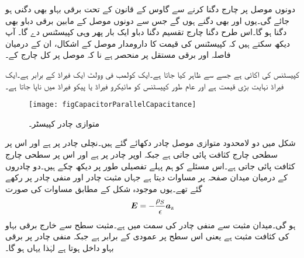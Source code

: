 دونوں موصل پر چارج دگنا کرنے سے گاوس کے قانون کے تحت برقی بہاو بھی دگنی ہو جائے گی۔یوں  اور  بھی دگنے ہوں گے جس سے دونوں موصل کے مابین برقی دباو بھی دگنا ہو گا۔اس طرح دگنا چارج تقسیم دگنا دباو ایک بار پھر وہی کپیسٹنس دے گا۔ آپ دیکھ سکتے ہیں کہ کپیسٹنس کی قیمت کا دارومدار موصل کے اشکال، ان کے درمیان فاصلہ اور برقی مستقل پر منحصر ہے نا کہ موصل پر کل چارج کے۔

کپیسٹنس کی اکائی  ہے جسے  سے ظاہر کیا جاتا ہے۔ایک کولمب فی وولٹ ایک فیراڈ کے برابر ہے۔ایک فیراڈ نہایت بڑی قیمت ہے اور عام طور کپیسٹنس کو مائیکرو فیراڈ  یا پیکو فیراڈ  میں ناپا جاتا ہے۔

\begin{figure}
\centering
\texttt{[image: figCapacitorParallelCapacitance]}
\caption{متوازی چادر کپیسٹر۔}
\label{شکل_کپیسٹر_متوازی_چادر_کپیسٹر}
\end{figure}

شکل  میں دو لامحدود متوازی موصل چادر دکھائے گئے ہیں۔نچلی چادر   پر ہے اور اس پر سطحی چارج کثافت  پائی جاتی ہے جبکہ اوپر چادر  پر ہے اور اس پر سطحی چارج کثافت  پائی جاتی ہے۔اس مسئلے کو ہم پہلے تفصیلی طور پر دیکھ چکے ہیں۔دو چادروں کے درمیان میدان صفحہ  پر مساوات  دیتا ہے جہاں مثبت
 چادر  اور منفی چادر  پر رکھے گئے تھے۔یوں موجودہ شکل کے مطابق مساوات  کی صورت
\begin{align*}
{\ensuremath{{\boldsymbol{E}}}}=-\frac{\rho_S}{\epsilon} {\boldsymbol{a}}_{\textup{z}}
\end{align*}
ہو گی۔میدان مثبت سے منفی چادر کی سمت میں ہے۔مثبت سطح سے خارج برقی بہاو کی کثافت مثبت ہے یعنی اس سطح پر عمودی  کے برابر ہے جبکہ منفی چادر پر برقی بہاو داخل ہوتا ہے لہٰذا یہاں  ہو گا۔

